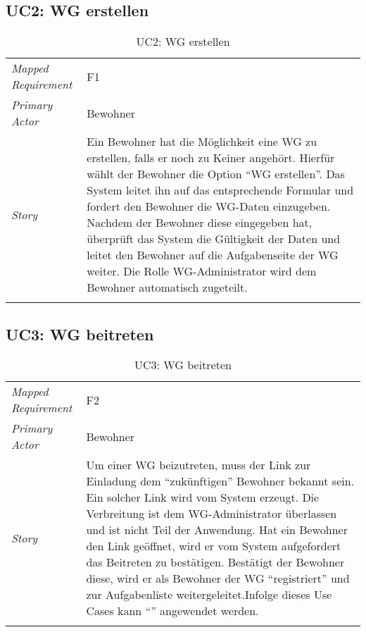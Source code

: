 \subsection{UC2: WG erstellen}\label{subsec:uc2}
\begin{table}[H]
	\tablestyle
	\tablealtcolored
	\begin{tabularx}{\textwidth}{lX}
		\tablebody
			\textit{Mapped Requirement} &
			F1
			\tabularnewline
			\textit{Primary Actor} &
			Bewohner
			\tabularnewline
			\textit{Story} &
			Ein Bewohner hat die Möglichkeit eine WG zu erstellen, falls er noch zu Keiner angehört. Hierfür wählt der Bewohner die Option ``WG erstellen''. Das System leitet ihn auf das entsprechende Formular und fordert den Bewohner die WG-Daten einzugeben. Nachdem der Bewohner diese eingegeben hat, überprüft das System die Gültigkeit der Daten und leitet den Bewohner auf die Aufgabenseite der WG weiter. Die Rolle WG-Administrator wird dem Bewohner automatisch zugeteilt.
			\tabularnewline
		\tableend
	\end{tabularx}
	\caption{UC2: WG erstellen}
\end{table}


\subsection{UC3: WG beitreten}\label{subsec:uc3}
\begin{table}[H]
	\tablestyle
	\tablealtcolored
	\begin{tabularx}{\textwidth}{lX}
		\tablebody
			\textit{Mapped Requirement} &
			F2
			\tabularnewline
			\textit{Primary Actor} &
			Bewohner
			\tabularnewline
			\textit{Story} &
			Um einer WG beizutreten, muss der Link zur Einladung dem ``zukünftigen'' Bewohner bekannt sein. Ein solcher Link wird vom System erzeugt. Die Verbreitung ist dem WG-Administrator überlassen und ist nicht Teil der Anwendung. Hat ein Bewohner den Link geöffnet, wird er vom System aufgefordert das Beitreten zu bestätigen. Bestätigt der Bewohner diese, wird er als Bewohner der WG ``registriert'' und zur Aufgabenliste weitergeleitet.\newline Infolge dieses Use Cases kann ``\nameref{subsec:uc11}'' angewendet werden.
			\tabularnewline
		\tableend
	\end{tabularx}
	\caption{UC3: WG beitreten}
\end{table}


